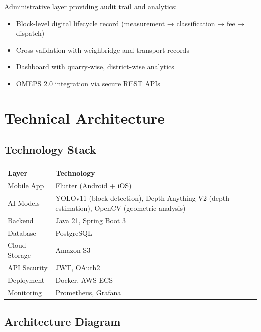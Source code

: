 \documentclass[11pt,a4paper]{article}
\begin{document}
Administrative layer providing audit trail and analytics:

\begin{itemize}[leftmargin=1.5em, itemsep=3pt]
  \item Block-level digital lifecycle record (measurement → classification → fee → dispatch)
  \item Cross-validation with weighbridge and transport records
  \item Dashboard with quarry-wise, district-wise analytics
  \item OMEPS 2.0 integration via secure REST APIs
\end{itemize}

\newpage
\section{Technical Architecture}

\subsection{Technology Stack}

\begin{center}
\begin{tabular}{|p{4cm}|p{8cm}|}
\hline
\textbf{Layer} & \textbf{Technology} \\
\hline
Mobile App & Flutter (Android + iOS) \\
\hline
AI Models & YOLOv11 (block detection), Depth Anything V2 (depth estimation), OpenCV (geometric analysis) \\
\hline
Backend & Java 21, Spring Boot 3 \\
\hline
Database & PostgreSQL \\
\hline
Cloud Storage & Amazon S3 \\
\hline
API Security & JWT, OAuth2 \\
\hline
Deployment & Docker, AWS ECS \\
\hline
Monitoring & Prometheus, Grafana \\
\hline
\end{tabular}
\end{center}

\subsection{Architecture Diagram}
\end{document}
